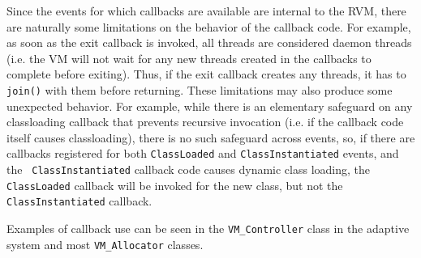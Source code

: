 Since the events for which callbacks are available are internal to the RVM,
there are naturally some limitations on the behavior of the callback code.  For
example, as soon as the exit callback is invoked, all threads are considered
daemon threads (i.e. the VM will not wait for any new threads created in the
callbacks to complete before exiting).  Thus, if the exit callback creates any
threads, it has to {\tt join()} with them before returning.  These limitations
may also produce some unexpected behavior.  For example, while there is an
elementary safeguard on any classloading callback that prevents recursive
invocation (i.e. if the callback code itself causes classloading), there is no
such safeguard across events, so, if there are callbacks registered for both
{\tt ClassLoaded} and {\tt ClassInstantiated} events, and the {\tt
ClassInstantiated} callback code causes dynamic class loading, the {\tt
ClassLoaded} callback will be invoked for the new class, but not the {\tt
ClassInstantiated} callback.

Examples of callback use can be seen in the {\tt VM\_Controller} class in the
adaptive system and most {\tt VM\_Allocator} classes.

